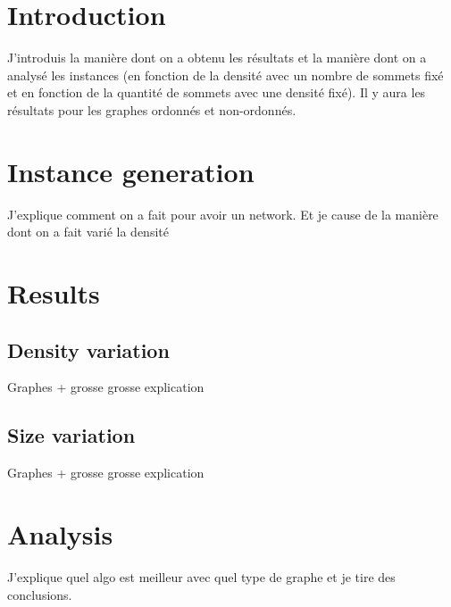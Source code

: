 \section{Introduction}
J'introduis la manière dont on a obtenu les résultats et la manière dont on a analysé les instances (en fonction de la densité avec un nombre de sommets fixé et en fonction de la quantité de sommets avec une densité fixé). Il y aura les résultats pour les graphes ordonnés et non-ordonnés.
\section{Instance generation}
J'explique comment on a fait pour avoir un network. Et je cause de la manière dont on a fait varié la densité
\section{Results}
\subsection{Density variation}
Graphes + grosse grosse explication
\subsection{Size variation}
Graphes + grosse grosse explication
\section{Analysis}
J'explique quel algo est meilleur avec quel type de graphe et je tire des conclusions.
